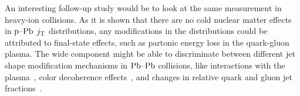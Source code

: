 An interesting follow-up study would be to look at the same measurement in heavy-ion collisions. As it is shown that there are no cold nuclear matter effects in $\mbox{p--Pb}$ $j_{\rm T}$ distributions, any modifications in the distributions could be attributed to final-state effects, such as partonic energy loss in the quark-gluon plasma. The wide component might be able to discriminate between different jet shape modification mechanisms in $\mbox{Pb--Pb}$ collisions, like interactions with the plasma~\cite{jetBroadeningAA}, color decoherence effects~\cite{antiangularOrdering}, and changes in relative quark and gluon jet fractions~\cite{jetShapeQGP}.
